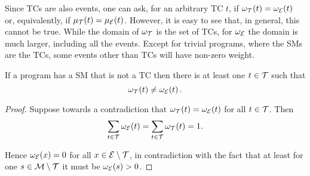 \documentclass[x11names]{tlp}
\begin{document}
Since \aclp{TC} are also events, one can ask, for an arbitrary \acl{TC} $t$, if $\wgtT\at{t} = \wgtE\at{t}$ or, equivalently, if $\pwt{t} = \pwe{t}$.
However, it is easy to see that, in general, this cannot be true.
While the domain of $\wgtT$ is the set of \aclp{TC}, for $\wgtE$ the domain is much larger, including all the events.
Except for trivial programs, where the
\acp{SM} are the \acp{TC}, some events other than \aclp{TC} will have non-zero weight.
\begin{proposition} \label{prop:two.distributions} %

	If a program has a \acl{SM} that is not a \acl{TC} then there is at least one
	$t\in\TCHOICEset$ such that
	\begin{equation}
		\wgtT\at{t} \not= \wgtE\at{t}. \label{eq:two.distributions}
	\end{equation}

\end{proposition}
\begin{proof}
	Suppose towards a contradiction that $\wgtT\at{t} = \wgtE\at{t}$ for
	all $t \in \TCHOICEset$.
Then
	\begin{equation*}
		\sum_{t\in\TCHOICEset} \wgtE\at{t} = \sum_{t\in\TCHOICEset} \wgtT\at{t} = 1.
	\end{equation*}

	Hence $\wgtE\at{x} = 0$ for all $x \in \EVENTSset\setminus\TCHOICEset$, in
	contradiction with the fact that at least for one $s \in
		\MODELset\setminus\TCHOICEset$ it must be $\wgtE\at{s} > 0$.
\end{proof}
\end{document}
